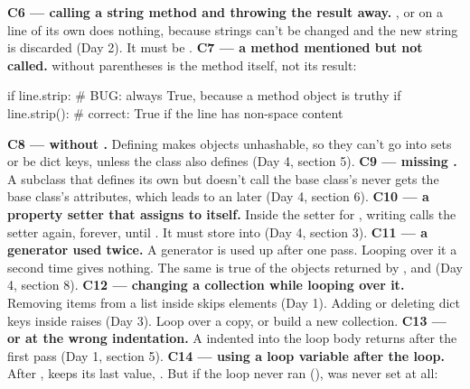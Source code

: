 \documentclass[10pt,a4paper]{article}
\begin{document}
\textbf{C6 — calling a string method and throwing the result away.} ,  or  on a line of its own does nothing, because strings can’t be changed and the new string is discarded (Day 2). It must be .
\textbf{C7 — a method mentioned but not called.}  without parentheses is the method itself, not its result:
\begin{pycode}
if line.strip:            # BUG: always True, because a method object is truthy
if line.strip():          # correct: True if the line has non-space content
\end{pycode}
\textbf{C8 —  without .} Defining  makes objects unhashable, so they can’t go into sets or be dict keys, unless the class also defines  (Day 4, section 5).
\textbf{C9 — missing .} A subclass that defines its own  but doesn’t call the base class’s  never gets the base class’s attributes, which leads to an  later (Day 4, section 6).
\textbf{C10 — a property setter that assigns to itself.} Inside the setter for , writing  calls the setter again, forever, until . It must store into  (Day 4, section 3).
\textbf{C11 — a generator used twice.} A generator is used up after one pass. Looping over it a second time gives nothing. The same is true of the objects returned by ,  and  (Day 4, section 8).
\textbf{C12 — changing a collection while looping over it.} Removing items from a list inside  skips elements (Day 1). Adding or deleting dict keys inside  raises  (Day 3). Loop over a copy, or build a new collection.
\textbf{C13 —  or  at the wrong indentation.} A  indented into the loop body returns after the first pass (Day 1, section 5).
\textbf{C14 — using a loop variable after the loop.} After ,  keeps its last value, . But if the loop never ran (),  was never set at all:
\end{document}

